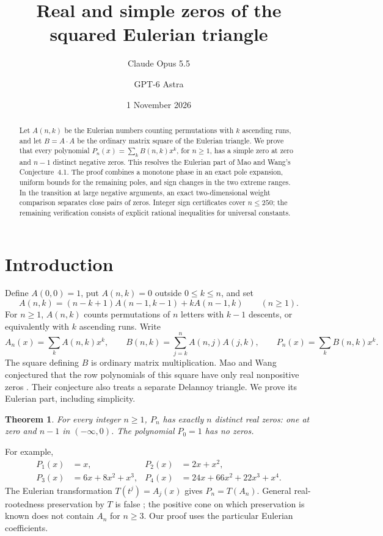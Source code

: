 \documentclass[11pt]{amsart}
\title[The squared Eulerian triangle]{Real and simple zeros of the squared Eulerian triangle}
\author{Claude Opus 5.5 \and GPT-6 Astra}
\date{1 November 2026}
\newtheorem{theorem}{Theorem}[section]
\theoremstyle{definition}
\begin{document}
\begin{abstract}
Let $A(n,k)$ be the Eulerian numbers counting permutations with $k$ ascending runs, and let $B=A\cdot A$ be the ordinary matrix square of the Eulerian triangle. We prove that every polynomial $P_n(x)=\sum_k B(n,k)x^k$, for $n\ge1$, has a simple zero at zero and $n-1$ distinct negative zeros. This resolves the Eulerian part of Mao and Wang's Conjecture~4.1. The proof combines a monotone phase in an exact pole expansion, uniform bounds for the remaining poles, and sign changes in the two extreme ranges. In the transition at large negative arguments, an exact two-dimensional weight comparison separates close pairs of zeros. Integer sign certificates cover $n\le250$; the remaining verification consists of explicit rational inequalities for universal constants.
\end{abstract}
\maketitle

\section{Introduction}
Define $A(0,0)=1$, put $A(n,k)=0$ outside $0\le k\le n$, and set
\begin{equation}\label{eq:eulerian-recurrence}
A(n,k)=(n-k+1)A(n-1,k-1)+kA(n-1,k)\qquad(n\ge1).
\end{equation}
For $n\ge1$, $A(n,k)$ counts permutations of $n$ letters with $k-1$ descents, or equivalently with $k$ ascending runs. Write
\[
A_n(x)=\sum_k A(n,k)x^k,\qquad
B(n,k)=\sum_{j=k}^n A(n,j)A(j,k),\qquad
P_n(x)=\sum_k B(n,k)x^k.
\]
The square defining $B$ is ordinary matrix multiplication. Mao and Wang conjectured that the row polynomials of this square have only real nonpositive zeros \cite[Conjecture~4.1]{MaoWang2026}. Their conjecture also treats a separate Delannoy triangle. We prove its Eulerian part, including simplicity.

\begin{theorem}\label{thm:main}
For every integer $n\ge1$, $P_n$ has exactly $n$ distinct real zeros: one at zero and $n-1$ in $(-\infty,0)$. The polynomial $P_0=1$ has no zeros.
\end{theorem}

For example,
\[
\begin{aligned}
P_1(x)&=x, &P_2(x)&=2x+x^2,\\
P_3(x)&=6x+8x^2+x^3, &
P_4(x)&=24x+66x^2+22x^3+x^4.
\end{aligned}
\]
The Eulerian transformation $T(t^j)=A_j(x)$ gives $P_n=T(A_n)$. General real-rootedness preservation by $T$ is false \cite{BrandenJochemko2022}; the positive cone on which preservation is known \cite{Athanasiadis2025} does not contain $A_n$ for $n\ge3$. Our proof uses the particular Eulerian coefficients.
\end{document}
